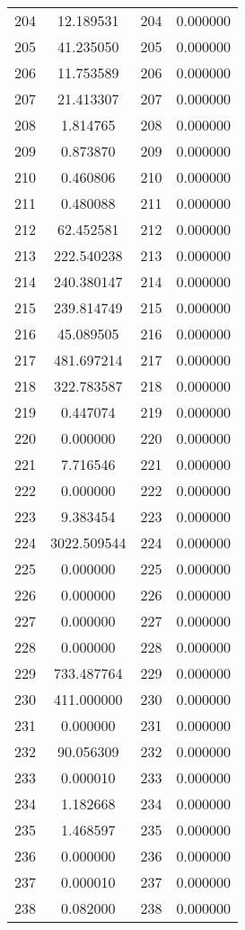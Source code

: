 \documentclass[12pt]{article}
\begin{document}
\begin{longtable}{@{}cccc@{}}
204 & 12.189531 & 204 & 0.000000 \\
205 & 41.235050 & 205 & 0.000000 \\
206 & 11.753589 & 206 & 0.000000 \\
207 & 21.413307 & 207 & 0.000000 \\
208 & 1.814765 & 208 & 0.000000 \\
209 & 0.873870 & 209 & 0.000000 \\
210 & 0.460806 & 210 & 0.000000 \\
211 & 0.480088 & 211 & 0.000000 \\
212 & 62.452581 & 212 & 0.000000 \\
213 & 222.540238 & 213 & 0.000000 \\
214 & 240.380147 & 214 & 0.000000 \\
215 & 239.814749 & 215 & 0.000000 \\
216 & 45.089505 & 216 & 0.000000 \\
217 & 481.697214 & 217 & 0.000000 \\
218 & 322.783587 & 218 & 0.000000 \\
219 & 0.447074 & 219 & 0.000000 \\
220 & 0.000000 & 220 & 0.000000 \\
221 & 7.716546 & 221 & 0.000000 \\
222 & 0.000000 & 222 & 0.000000 \\
223 & 9.383454 & 223 & 0.000000 \\
224 & 3022.509544 & 224 & 0.000000 \\
225 & 0.000000 & 225 & 0.000000 \\
226 & 0.000000 & 226 & 0.000000 \\
227 & 0.000000 & 227 & 0.000000 \\
228 & 0.000000 & 228 & 0.000000 \\
229 & 733.487764 & 229 & 0.000000 \\
230 & 411.000000 & 230 & 0.000000 \\
231 & 0.000000 & 231 & 0.000000 \\
232 & 90.056309 & 232 & 0.000000 \\
233 & 0.000010 & 233 & 0.000000 \\
234 & 1.182668 & 234 & 0.000000 \\
235 & 1.468597 & 235 & 0.000000 \\
236 & 0.000000 & 236 & 0.000000 \\
237 & 0.000010 & 237 & 0.000000 \\
238 & 0.082000 & 238 & 0.000000 \\

\end{longtable}
\end{document}
